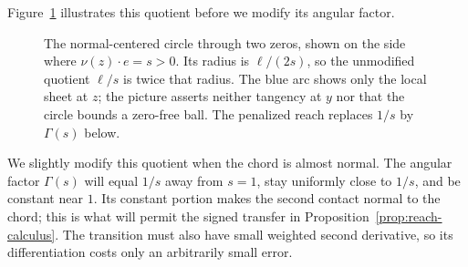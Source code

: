 Figure~\ref{fig:reach-tangent-ball} illustrates this quotient before
we modify its angular factor.

\begin{figure}[ht]
\centering
{}
\caption{The normal-centered circle through two zeros, shown on the
side where $\nu(z)\cdot e=s>0$. Its radius is $\ell/(2s)$, so the
unmodified quotient $\ell/s$ is twice that radius. The blue arc shows
only the local sheet at $z$; the picture asserts neither tangency at
$y$ nor that the circle bounds a zero-free ball. The penalized reach
replaces $1/s$ by $\Gamma(s)$ below.}
\label{fig:reach-tangent-ball}
\end{figure}

We slightly modify this quotient when the chord is almost normal.
The angular factor $\Gamma(s)$ will equal $1/s$ away from $s=1$,
stay uniformly close to $1/s$, and be constant near $1$.
Its constant portion makes the second contact normal to the chord;
this is what will permit the signed transfer in
Proposition~\ref{prop:reach-calculus}.  The transition must also have
small weighted second derivative, so its differentiation costs only
an arbitrarily small error.

